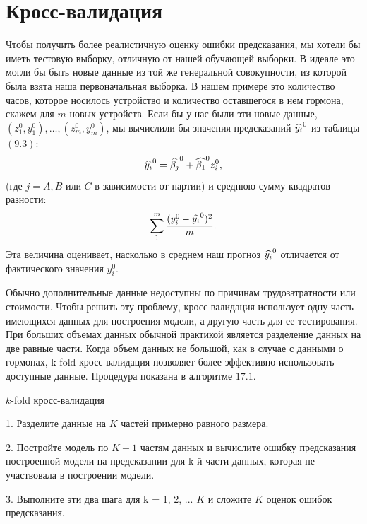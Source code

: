 \section{Кросс-валидация}
Чтобы получить более реалистичную оценку ошибки предсказания, мы хотели бы иметь тестовую выборку, отличную от нашей обучающей выборки. В идеале это могли бы быть новые данные из той же генеральной совокупности, из которой была взята наша первоначальная выборка. В нашем примере это количество часов, которое носилось устройство и количество оставшегося в нем гормона, скажем для $m$ новых устройств. Если бы у нас были эти новые данные, $(z_{1}^{0}, y_{1}^{0}),\ldots, (z_{m}^{0},y_{m}^{0})$, мы вычислили бы значения предсказаний $\widehat{y_{i}}^{0}$ из таблицы $(9.3)$:
\begin{equation}
\widehat{y_{i}}^{0} = \widehat{\beta_{j}}^{0} + \widehat{\beta_{1}}^{0}z_{i}^{0},
\end{equation}
(где $j = A, B$ или $C$ в зависимости от партии) и среднюю сумму квадратов разности:
\begin{equation}
\sum_{1}^{m} \frac{(y_{i}^{0} - \widehat{y_{i}}^{0})^{2}}{m}.
\end{equation}
Эта величина оценивает, насколько в среднем наш прогноз $\widehat{y_{i}}^{0}$ отличается от фактического значения $y_{i}^{0}$. 

Обычно дополнительные данные недоступны по причинам трудозатратности или стоимости. Чтобы решить эту проблему, кросс-валидация использует одну часть имеющихся данных для построения модели, а другую часть для ее тестирования. При больших объемах данных обычной практикой является разделение данных на две равные части. Когда объем данных не большой, как в случае с данными о гормонах, k-fold кросс-валидация позволяет более эффективно использовать доступные данные. Процедура показана в алгоритме $17.1.$
\begin{algorithm}
\caption{$k$-fold кросс-валидация}
1. Разделите данные на $K$ частей примерно равного размера.

2. Постройте модель по $K - 1$ частям данных и вычислите ошибку предсказания построенной модели на предсказании для k-й части данных, которая не участвовала в построении модели.

3. Выполните эти два шага для k = 1, 2, ... $K$ и сложите $K$ оценок ошибок предсказания.
\end{algorithm}


